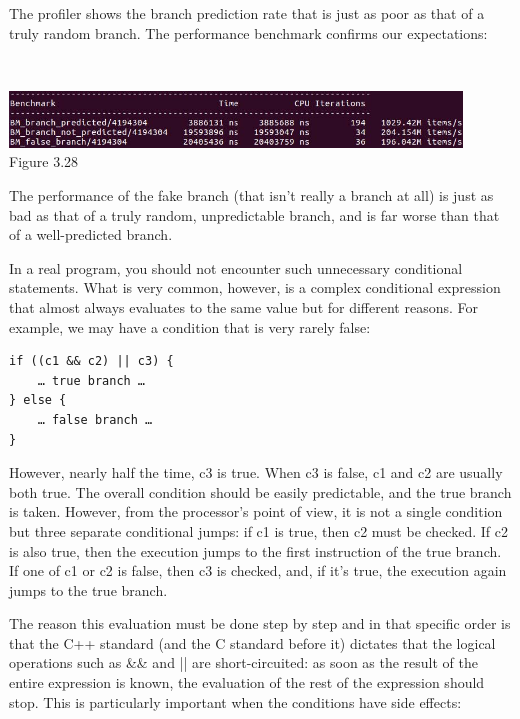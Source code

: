 The profiler shows the branch prediction rate that is just as poor as that of a truly random branch. The performance benchmark confirms our expectations:


\hspace*{\fill} \\ %
\begin{center}
\includegraphics[width=0.9\textwidth]{content/1/chapter3/images/28.jpg}\\
Figure 3.28
\end{center}

The performance of the fake branch (that isn't really a branch at all) is just as bad as that of a truly random, unpredictable branch, and is far worse than that of a well-predicted branch.

In a real program, you should not encounter such unnecessary conditional statements. What is very common, however, is a complex conditional expression that almost always evaluates to the same value but for different reasons. For example, we may have a condition that is very rarely false:

\begin{lstlisting}[style=styleCXX]
if ((c1 && c2) || c3) {
	… true branch …
} else {
	… false branch …
}
\end{lstlisting}

However, nearly half the time, c3 is true. When c3 is false, c1 and c2 are usually both true. The overall condition should be easily predictable, and the true branch is taken. However, from the processor's point of view, it is not a single condition but three separate conditional jumps: if c1 is true, then c2 must be checked. If c2 is also true, then the execution jumps to the first instruction of the true branch. If one of c1 or c2 is false, then c3 is checked, and, if it's true, the execution again jumps to the true branch.

The reason this evaluation must be done step by step and in that specific order is that the C++ standard (and the C standard before it) dictates that the logical operations such as \&\& and || are short-circuited: as soon as the result of the entire expression is known, the evaluation of the rest of the expression should stop. This is particularly important when the conditions have side effects:


